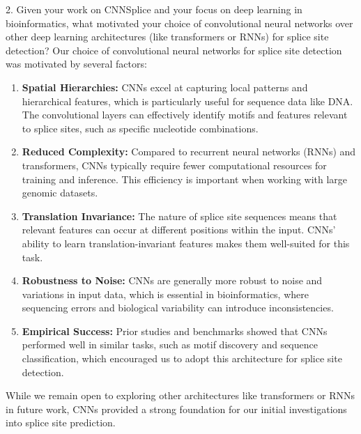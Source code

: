 2. Given your work on CNNSplice and your focus on deep learning in bioinformatics, what motivated your choice of convolutional neural networks over other deep learning architectures (like transformers or RNNs) for splice site detection?
Our choice of convolutional neural networks for splice site detection was motivated by several factors:
\begin{enumerate}
    \item \textbf{Spatial Hierarchies:} CNNs excel at capturing local patterns and hierarchical features, which is particularly useful for sequence data like DNA. The convolutional layers can effectively identify motifs and features relevant to splice sites, such as specific nucleotide combinations.
    \item \textbf{Reduced Complexity:} Compared to recurrent neural networks (RNNs) and transformers, CNNs typically require fewer computational resources for training and inference. This efficiency is important when working with large genomic datasets.
    \item \textbf{Translation Invariance:} The nature of splice site sequences means that relevant features can occur at different positions within the input. CNNs’ ability to learn translation-invariant features makes them well-suited for this task.
    \item \textbf{Robustness to Noise:} CNNs are generally more robust to noise and variations in input data, which is essential in bioinformatics, where sequencing errors and biological variability can introduce inconsistencies.
    \item \textbf{Empirical Success:} Prior studies and benchmarks showed that CNNs performed well in similar tasks, such as motif discovery and sequence classification, which encouraged us to adopt this architecture for splice site detection.
\end{enumerate}

While we remain open to exploring other architectures like transformers or RNNs in future work, CNNs provided a strong foundation for our initial investigations into splice site prediction.